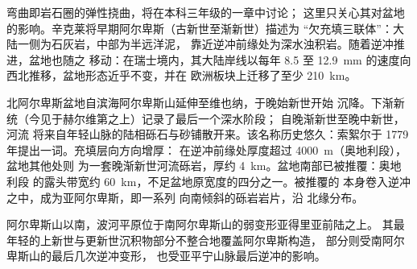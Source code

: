 弯曲即岩石圈的弹性挠曲，将在本科三年级的一章中讨论；
这里只关心其对盆地的影响。辛克莱将早期阿尔卑斯（古新世至渐新世）描述为
“欠充填三联体”：大陆一侧为石灰岩，中部为半远洋泥，
靠近逆冲前缘处为深水浊积岩。随着逆冲推进，盆地也随之
移动：在瑞士境内，其大陆岸线以每年 8.5
至 \qty{12.9}{mm} 的速度向西北推移，盆地形态近乎不变，并在
欧洲板块上迁移了至少 \qty{210}{km}。

北阿尔卑斯盆地自滨海阿尔卑斯山延伸至维也纳，于晚始新世开始
沉降。下渐新统（今见于赫尔维第之上）记录了最后一个深水阶段；
自晚渐新世至晚中新世，河流
将来自年轻山脉的陆相砾石与砂铺散开来。该名称历史悠久：索絮尔于
1779 年提出\emph{}一词。充填层向方向增厚：
在逆冲前缘处厚度超过 \qty{4000}{m}（奥地利段），盆地其他处则
为一套晚渐新世河流砾岩，厚约 \qty{4}{km}。盆地南部已被推覆：奥地利段
的露头带宽约 \qty{60}{km}，不足盆地原宽度的四分之一。被推覆的
本身卷入逆冲之中，成为亚阿尔卑斯，即一系列
向南倾斜的砾岩岩片，沿
北缘分布。

阿尔卑斯山以南，波河平原位于南阿尔卑斯山的弱变形亚得里亚前陆之上。
其最年轻的上新世与更新世沉积物部分不整合地覆盖阿尔卑斯构造，
部分则受南阿尔卑斯山的最后几次逆冲变形，
也受亚平宁山脉最后逆冲的影响。

